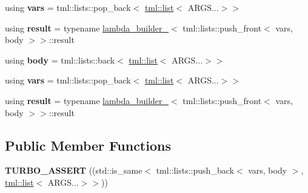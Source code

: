 \begin{DoxyCompactItemize}
\item 
\hypertarget{structtml_1_1impl_1_1lambda__builder_3_01tml_1_1list_3_01ARGS_8_8_8_4_01_4_a517ba7f0c4a793e7e15a177395897b9e}{using {\bfseries vars} = tml\+::lists\+::pop\+\_\+back$<$ \hyperlink{structtml_1_1list}{tml\+::list}$<$ A\+R\+G\+S...$>$$>$}\label{structtml_1_1impl_1_1lambda__builder_3_01tml_1_1list_3_01ARGS_8_8_8_4_01_4_a517ba7f0c4a793e7e15a177395897b9e}

\item 
\hypertarget{structtml_1_1impl_1_1lambda__builder_3_01tml_1_1list_3_01ARGS_8_8_8_4_01_4_a36622880ba9a73f0aab116a22a6e4194}{using {\bfseries result} = typename \hyperlink{structtml_1_1impl_1_1lambda__builder__2}{lambda\+\_\+builder\+\_}$<$ tml\+::lists\+::push\+\_\+front$<$ vars, body $>$$>$\+::result}\label{structtml_1_1impl_1_1lambda__builder_3_01tml_1_1list_3_01ARGS_8_8_8_4_01_4_a36622880ba9a73f0aab116a22a6e4194}

\item 
\hypertarget{structtml_1_1impl_1_1lambda__builder_3_01tml_1_1list_3_01ARGS_8_8_8_4_01_4_a255a0138d291b6017e7e48b05c70b481}{using {\bfseries body} = tml\+::lists\+::back$<$ \hyperlink{structtml_1_1list}{tml\+::list}$<$ A\+R\+G\+S...$>$$>$}\label{structtml_1_1impl_1_1lambda__builder_3_01tml_1_1list_3_01ARGS_8_8_8_4_01_4_a255a0138d291b6017e7e48b05c70b481}

\item 
\hypertarget{structtml_1_1impl_1_1lambda__builder_3_01tml_1_1list_3_01ARGS_8_8_8_4_01_4_a517ba7f0c4a793e7e15a177395897b9e}{using {\bfseries vars} = tml\+::lists\+::pop\+\_\+back$<$ \hyperlink{structtml_1_1list}{tml\+::list}$<$ A\+R\+G\+S...$>$$>$}\label{structtml_1_1impl_1_1lambda__builder_3_01tml_1_1list_3_01ARGS_8_8_8_4_01_4_a517ba7f0c4a793e7e15a177395897b9e}

\item 
\hypertarget{structtml_1_1impl_1_1lambda__builder_3_01tml_1_1list_3_01ARGS_8_8_8_4_01_4_a36622880ba9a73f0aab116a22a6e4194}{using {\bfseries result} = typename \hyperlink{structtml_1_1impl_1_1lambda__builder__2}{lambda\+\_\+builder\+\_}$<$ tml\+::lists\+::push\+\_\+front$<$ vars, body $>$$>$\+::result}\label{structtml_1_1impl_1_1lambda__builder_3_01tml_1_1list_3_01ARGS_8_8_8_4_01_4_a36622880ba9a73f0aab116a22a6e4194}

\end{DoxyCompactItemize}
\subsection*{Public Member Functions}
\begin{DoxyCompactItemize}
\item 
\hypertarget{structtml_1_1impl_1_1lambda__builder_3_01tml_1_1list_3_01ARGS_8_8_8_4_01_4_a17f429e94339ade40fadc25f22834927}{{\bfseries T\+U\+R\+B\+O\+\_\+\+A\+S\+S\+E\+R\+T} ((std\+::is\+\_\+same$<$ tml\+::lists\+::push\+\_\+back$<$ vars, body $>$, \hyperlink{structtml_1_1list}{tml\+::list}$<$ A\+R\+G\+S...$>$$>$))}\label{structtml_1_1impl_1_1lambda__builder_3_01tml_1_1list_3_01ARGS_8_8_8_4_01_4_a17f429e94339ade40fadc25f22834927}

\end{DoxyCompactItemize}


